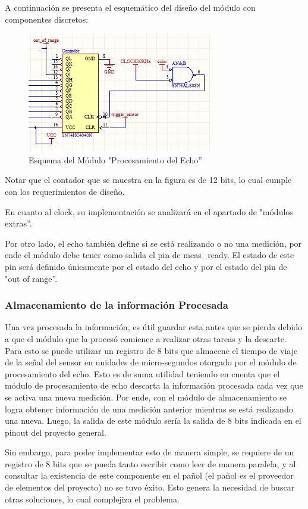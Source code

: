 A continuación se presenta el esquemático del diseño del módulo con
componentes discretos:

\begin{figure}[H]
\centering
\includegraphics[scale=0.7]{esquemaProcesamientoDeEcho.PNG}
\caption{Esquema del Módulo "Procesamiento del Echo''}
\end{figure}

Notar que el contador que se muestra en la figura es de 12 bits, lo
cual cumple con los requerimientos de diseño.

En cuanto al clock, su implementación se analizará en el apartado
de "módulos extras''.

Por otro lado, el echo también define si se está realizando o no una
medición, por ende el módulo debe tener como salida el pin de meas\_ready.
El estado de este pin será definido únicamente por el estado del echo
y por el estado del pin de "out of range''.

\subsubsection{Almacenamiento de la información Procesada}

Una vez procesada la información, es útil guardar esta antes que se
pierda debido a que el módulo que la procesó comience a realizar otras
tareas y la descarte. Para esto se puede utilizar un registro de 8
bits que almacene el tiempo de viaje de la señal del sensor en unidades
de micro-segundos otorgado por el módulo de procesamiento del echo.
Esto es de suma utilidad teniendo en cuenta que el módulo de procesamiento
de echo descarta la información procesada cada vez que se activa una
nueva medición. Por ende, con el módulo de almacenamiento 
se logra obtener información de una medición anterior mientras se
está realizando una nueva. Luego, la salida de este módulo
sería la salida de 8 bits indicada en el pinout del proyecto general.

Sin embargo, para poder implementar esto de manera simple, se requiere
de un registro de 8 bits que se pueda tanto escribir como leer de
manera paralela, y al consultar la existencia de este componente en
el pañol (el pañol es el proveedor de elementos del proyecto) no se
tuvo éxito. Esto genera la necesidad de buscar otras soluciones, lo
cual complejiza el problema. 

